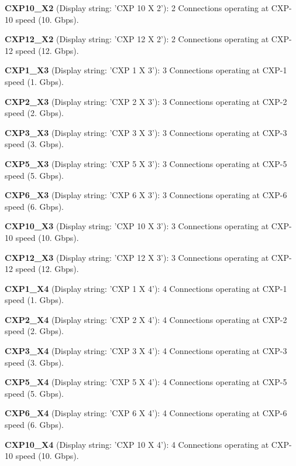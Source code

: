 \begin{DoxyItemize}
\item {\bfseries C\+X\+P10\+\_\+\+X2} (Display string\+: 'C\+X\+P 10 X 2')\+: 2 Connections operating at C\+X\+P-\/10 speed (10. Gbps).
\item {\bfseries C\+X\+P12\+\_\+\+X2} (Display string\+: 'C\+X\+P 12 X 2')\+: 2 Connections operating at C\+X\+P-\/12 speed (12. Gbps).
\item {\bfseries C\+X\+P1\+\_\+\+X3} (Display string\+: 'C\+X\+P 1 X 3')\+: 3 Connections operating at C\+X\+P-\/1 speed (1. Gbps).
\item {\bfseries C\+X\+P2\+\_\+\+X3} (Display string\+: 'C\+X\+P 2 X 3')\+: 3 Connections operating at C\+X\+P-\/2 speed (2. Gbps).
\item {\bfseries C\+X\+P3\+\_\+\+X3} (Display string\+: 'C\+X\+P 3 X 3')\+: 3 Connections operating at C\+X\+P-\/3 speed (3. Gbps).
\item {\bfseries C\+X\+P5\+\_\+\+X3} (Display string\+: 'C\+X\+P 5 X 3')\+: 3 Connections operating at C\+X\+P-\/5 speed (5. Gbps).
\item {\bfseries C\+X\+P6\+\_\+\+X3} (Display string\+: 'C\+X\+P 6 X 3')\+: 3 Connections operating at C\+X\+P-\/6 speed (6. Gbps).
\item {\bfseries C\+X\+P10\+\_\+\+X3} (Display string\+: 'C\+X\+P 10 X 3')\+: 3 Connections operating at C\+X\+P-\/10 speed (10. Gbps).
\item {\bfseries C\+X\+P12\+\_\+\+X3} (Display string\+: 'C\+X\+P 12 X 3')\+: 3 Connections operating at C\+X\+P-\/12 speed (12. Gbps).
\item {\bfseries C\+X\+P1\+\_\+\+X4} (Display string\+: 'C\+X\+P 1 X 4')\+: 4 Connections operating at C\+X\+P-\/1 speed (1. Gbps).
\item {\bfseries C\+X\+P2\+\_\+\+X4} (Display string\+: 'C\+X\+P 2 X 4')\+: 4 Connections operating at C\+X\+P-\/2 speed (2. Gbps).
\item {\bfseries C\+X\+P3\+\_\+\+X4} (Display string\+: 'C\+X\+P 3 X 4')\+: 4 Connections operating at C\+X\+P-\/3 speed (3. Gbps).
\item {\bfseries C\+X\+P5\+\_\+\+X4} (Display string\+: 'C\+X\+P 5 X 4')\+: 4 Connections operating at C\+X\+P-\/5 speed (5. Gbps).
\item {\bfseries C\+X\+P6\+\_\+\+X4} (Display string\+: 'C\+X\+P 6 X 4')\+: 4 Connections operating at C\+X\+P-\/6 speed (6. Gbps).
\item {\bfseries C\+X\+P10\+\_\+\+X4} (Display string\+: 'C\+X\+P 10 X 4')\+: 4 Connections operating at C\+X\+P-\/10 speed (10. Gbps).

\end{DoxyItemize}
